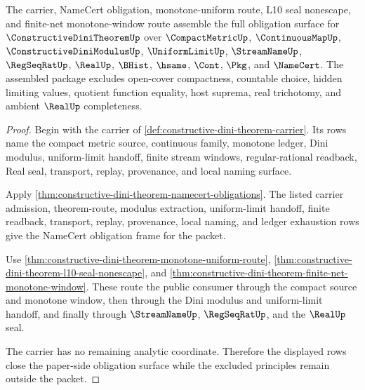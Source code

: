 \begin{theorem}
\label{thm:constructive-dini-theorem-obligation-closure-package}
The carrier, NameCert obligation, monotone-uniform route, L10 seal nonescape, and finite-net monotone-window route assemble the full obligation surface for $\ConstructiveDiniTheoremUp$ over $\CompactMetricUp$, $\ContinuousMapUp$, $\ConstructiveDiniModulusUp$, $\UniformLimitUp$, $\StreamNameUp$, $\RegSeqRatUp$, $\RealUp$, $\BHist$, $\hsame$, $\Cont$, $\Pkg$, and $\NameCert$. The assembled package excludes open-cover compactness, countable choice, hidden limiting values, quotient function equality, host suprema, real trichotomy, and ambient $\RealUp$ completeness.
\end{theorem}
\begin{proof}
Begin with the carrier of \autoref{def:constructive-dini-theorem-carrier}. Its rows name the compact metric source, continuous family, monotone ledger, Dini modulus, uniform-limit handoff, finite stream windows, regular-rational readback, Real seal, transport, replay, provenance, and local naming surface.

Apply \autoref{thm:constructive-dini-theorem-namecert-obligations}. The listed carrier admission, theorem-route, modulus extraction, uniform-limit handoff, finite readback, transport, replay, provenance, local naming, and ledger exhaustion rows give the NameCert obligation frame for the packet.

Use \autoref{thm:constructive-dini-theorem-monotone-uniform-route}, \autoref{thm:constructive-dini-theorem-l10-seal-nonescape}, and \autoref{thm:constructive-dini-theorem-finite-net-monotone-window}. These route the public consumer through the compact source and monotone window, then through the Dini modulus and uniform-limit handoff, and finally through $\StreamNameUp$, $\RegSeqRatUp$, and the $\RealUp$ seal.

The carrier has no remaining analytic coordinate. Therefore the displayed rows close the paper-side obligation surface while the excluded principles remain outside the packet.
\end{proof}


